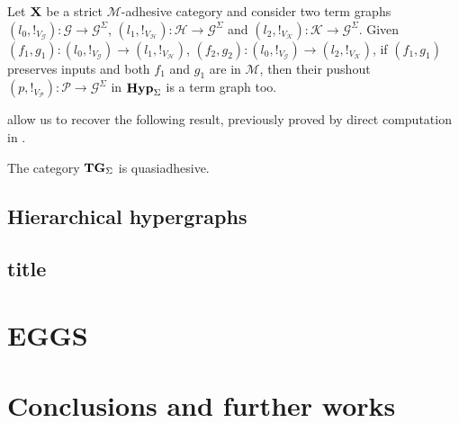 \documentclass[runningheads,envcountsect]{lipics-v2021}
\def\X{\textbf {\textup{X}}}
\newcommand{\catname}[1]{\textbf{\textup{#1}}}
\newcommand{\hyp}{\catname{Hyp}}
\newcommand{\tg}[0]{\catname{TG}_{\Sigma}}
\begin{document}
\begin{lemma}\label{prop:push}Let $\X$ be a strict $\mathcal{M}$-adhesive category and consider two term graphs $(l_0, !_{V_\mathcal{G}})\colon \mathcal{G}\to \mathcal{G}^{\Sigma}$, $(l_1, !_{V_\mathcal{H}})\colon \mathcal{H}\to \mathcal{G}^{\Sigma}$ and $(l_2, !_{V_\mathcal{K}})\colon \mathcal{K}\to \mathcal{G}^{\Sigma}$. Given $(f_1, g_1)\colon (l_0, !_{V_\mathcal{G}})\to (l_1, !_{V_\mathcal{H}})$, $(f_2, g_2)\colon (l_0, !_{V_\mathcal{G}})\to (l_2, !_{V_\mathcal{K}})$, if $(f_1, g_1)$ preserves inputs and both $f_1$ and $g_1$ are in $\mathcal{M}$,  then their pushout $(p, !_{V_{\mathcal{P}}})\colon \mathcal{P}\to \mathcal{G}^{\Sigma}$ in $\hyp_{\Sigma}$ is a term graph too.
\end{lemma}


 allow us to recover the following result, previously proved by direct computation in \cite[Thm.~4.2]{corradini2005term}.
\begin{corollary}
	The category $\tg$ is quasiadhesive.
\end{corollary}


\subsection{Hierarchical hypergraphs}






\subsection{title}

\section{EGGS}

\section{Conclusions and further works}


\appendix
\end{document}
